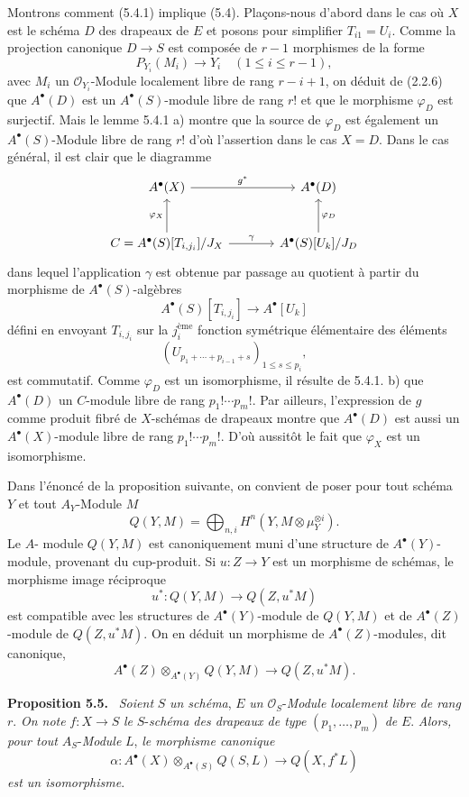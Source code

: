 \documentclass[11pt]{article}
\newenvironment{statement}[1]{\par\medskip\noindent\textbf{#1.}\ }{\par\medskip}
\begin{document}
Montrons comment (5.4.1) implique (5.4). Plaçons-nous d'abord dans le cas 
où $X$ est le
schéma $D$ des drapeaux de $E$ et posons pour simplifier $T_{i1}=U_i$. Comme la projection canonique $D\to S$ est composée de $r-1$ morphismes de la forme
\[
P_{Y_i}(M_i)\to Y_i\quad(1\le i\le r-1),
\]
avec $M_i$ un $\mathcal O_{Y_i}$-Module localement libre de rang $r-i+1$, on déduit de (2.2.6) que $A^{\bullet}(D)$ est un $A^{\bullet}(S)$-module libre de rang $r!$ et que le morphisme $\varphi_D$ est surjectif. Mais le lemme 5.4.1 a) montre que la source de $\varphi_D$ est également un $A^{\bullet}(S)$-Module libre de rang $r!$ d'où l'assertion dans le cas $X=D$. Dans le cas général, il est clair que le diagramme
\[
\begin{tikzcd}[column sep=large,row sep=large]
A^{\bullet}(X) \arrow[r,"g^*"] & A^{\bullet}(D)\\
C=A^{\bullet}(S)[T_{i,j_i}]/J_X \arrow[u,"\varphi_X"] \arrow[r,"\gamma"] &
A^{\bullet}(S)[U_k]/J_D \arrow[u,"\varphi_D"']
\end{tikzcd}
\]
dans lequel l'application $\gamma$ est obtenue par passage au quotient à partir du morphisme de $A^{\bullet}(S)$-algèbres
\[
A^\bullet(S)[T_{i,j_i}]\to A^\bullet[U_k]
\]
défini en envoyant $T_{i,j_i}$ sur la $j_i^{\text{ème}}$ fonction symétrique élémentaire des éléments
\[
(U_{p_1+\cdots+p_{i-1}+s})_{1\le s\le p_i},
\]
est commutatif. Comme $\varphi_D$ est un isomorphisme, il résulte de 5.4.1. b) que $A^{\bullet}(D)$ un $C$-module libre de rang $p_1!\cdots p_m!$. Par ailleurs, l'expression de $g$ comme produit fibré de $X$-schémas de drapeaux montre que $A^{\bullet}(D)$ est aussi un $A^{\bullet}(X)$-module libre de rang $p_1!\cdots p_m!$. D'où aussitôt le fait que $\varphi_X$ est un isomorphisme.

Dans l'énoncé de la proposition suivante, on convient de poser pour tout schéma $Y$ et tout $A_Y$-Module $M$
\[
Q(Y,M)=\bigoplus_{n,i}H^n(Y,M\otimes\mu_Y^{\otimes i}).
\]
Le $A$-
module $Q(Y,M)$ est canoniquement muni d'une structure de $A^\bullet(Y)$-module, provenant du cup-produit. Si $u:Z\to Y$ est un morphisme de schémas, le morphisme image réciproque
\[
u^*:Q(Y,M)\to Q(Z,u^*M)
\]
est compatible avec les structures de $A^\bullet(Y)$-module de $Q(Y,M)$ et de $A^\bullet(Z)$-module de $Q(Z,u^*M)$. On en déduit un morphisme de $A^\bullet(Z)$-modules, dit canonique,
\[
A^\bullet(Z)\otimes_{A^\bullet(Y)}Q(Y,M)\to Q(Z,u^*M).
\]

\begin{statement}{Proposition 5.5}
\emph{Soient} $S$ \emph{un schéma}, $E$ \emph{un} $\mathcal O_S$-\emph{Module localement libre de rang} $r$. \emph{On note} $f:X\to S$ \emph{le} $S$-\emph{schéma des drapeaux de type} $(p_1,\ldots,p_m)$ \emph{de} $E$. \emph{Alors, pour tout} $A_S$-\emph{Module} $L$, \emph{le morphisme canonique}
\[
\alpha:A^\bullet(X)\otimes_{A^\bullet(S)}Q(S,L)\to Q(X,f^*L)
\]
\emph{est un isomorphisme}.
\end{statement}
\end{document}
